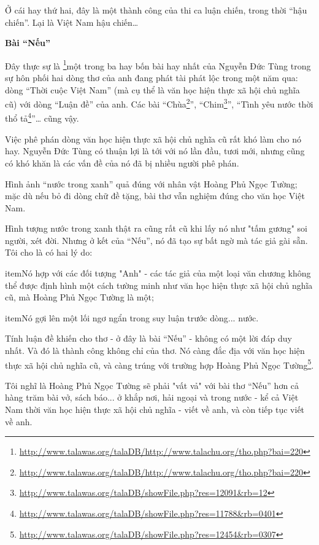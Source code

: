 \documentclass[../main.tex]{subfiles}
\begin{document}
\begin{multicols}{2}
Ở cái hay thứ hai, đây là một thành công của thi ca luận chiến, trong thời “hậu chiến”. Lại là Việt Nam hậu chiến… 
 
 
\textbf{Bài “Nếu” } 
 
Đây thực sự là \footnote{\url{http://www.talawas.org/talaDB/http://www.talachu.org/tho.php?bai=220}}một trong ba hay bốn bài hay nhất của Nguyễn Đức Tùng trong sự hôn phối hai dòng thơ của anh đang phát tài phát lộc trong một năm qua: dòng “Thời cuộc Việt Nam” (mà cụ thể là văn học hiện thực xã hội chủ nghĩa cũ) với dòng “Luận đề” của anh. Các bài “Chùa\footnote{\url{http://www.talawas.org/talaDB/http://www.talachu.org/tho.php?bai=220}}”, “Chim\footnote{\url{http://www.talawas.org/talaDB/showFile.php?res=12091&rb=12}}”, “Tình yêu nước thời thổ tả\footnote{\url{http://www.talawas.org/talaDB/showFile.php?res=11788&rb=0401}}”… cũng vậy. 
 
Việc phê phán dòng văn học hiện thực xã hội chủ nghĩa cũ rất khó làm cho nó hay. Nguyễn Đức Tùng có thuận lợi là tới với nó lần đầu, tươi mới, nhưng cũng có khó khăn là các vấn đề của nó đã bị nhiều người phê phán. 
 
Hình ảnh “nước trong xanh” quả đúng với nhân vật Hoàng Phủ Ngọc Tường; mặc dù nếu bỏ đi dòng chữ đề tặng, bài thơ vẫn nghiệm đúng cho văn học Việt Nam. 
 
Hình tượng nước trong xanh thật ra cũng rất cũ khi lấy nó như "tấm gương" soi người, xét đời. Nhưng ở kết của “Nếu”, nó đã tạo sự bất ngờ mà tác giả gài sẵn. Tôi cho là có hai lý do:  
 \begin{enumerate}

item{Nó hợp với các đối tượng "Anh" - các tác giả của một loại văn chương không thể được định hình một cách tường minh như văn học hiện thực xã hội chủ nghĩa cũ, mà Hoàng Phủ Ngọc Tường là một;  }

item{Nó gợi lên một lối ngơ ngẩn trong suy luận trước dòng... nước.  }

\end{enumerate}
 Tính luận đề khiến cho thơ - ở đây là bài “Nếu” - không có một lời đáp duy nhất. Và đó là thành công không chỉ của thơ. Nó càng đắc địa với văn học hiện thực xã hội chủ nghĩa cũ, và càng trúng với trường hợp Hoàng Phủ Ngọc Tường\footnote{\url{http://www.talawas.org/talaDB/showFile.php?res=12454&rb=0307}}. 
 
Tôi nghĩ là Hoàng Phủ Ngọc Tường sẽ phải "vất vả" với bài thơ “Nếu” hơn cả hàng trăm bài vở, sách báo... ở khắp nơi, hải ngoại và trong nước - kể cả Việt Nam thời văn học hiện thực xã hội chủ nghĩa - viết về anh, và còn tiếp tục viết về anh.  
 

\end{multicols}
\end{document}
